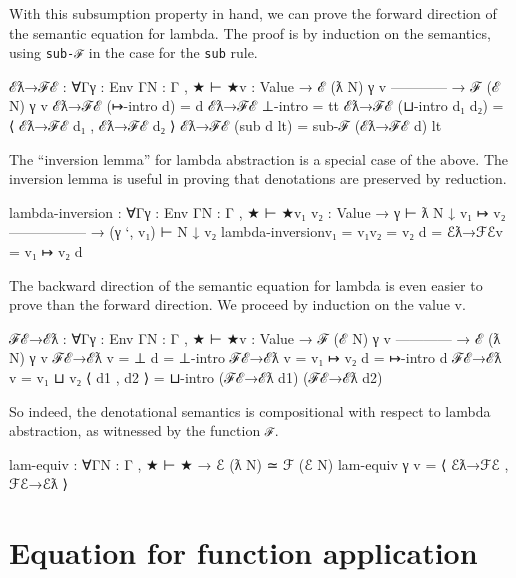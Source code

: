 With this subsumption property in hand, we can prove the forward
direction of the semantic equation for lambda. The proof is by induction
on the semantics, using \texttt{sub-ℱ} in the case for the \texttt{sub}
rule.

\begin{fence}
\begin{code}
ℰƛ→ℱℰ : ∀{Γ}{γ : Env Γ}{N : Γ , ★ ⊢ ★}{v : Value}
  → ℰ (ƛ N) γ v
    ------------
  → ℱ (ℰ N) γ v
ℰƛ→ℱℰ (↦-intro d) = d
ℰƛ→ℱℰ ⊥-intro = tt
ℰƛ→ℱℰ (⊔-intro d₁ d₂) = ⟨ ℰƛ→ℱℰ d₁ , ℰƛ→ℱℰ d₂ ⟩
ℰƛ→ℱℰ (sub d lt) = sub-ℱ (ℰƛ→ℱℰ d) lt
\end{code}
\end{fence}

The ``inversion lemma'' for lambda abstraction is a special case of the
above. The inversion lemma is useful in proving that denotations are
preserved by reduction.

\begin{fence}
\begin{code}
lambda-inversion : ∀{Γ}{γ : Env Γ}{N : Γ , ★ ⊢ ★}{v₁ v₂ : Value}
  → γ ⊢ ƛ N ↓ v₁ ↦ v₂
    -----------------
  → (γ `, v₁) ⊢ N ↓ v₂
lambda-inversion{v₁ = v₁}{v₂ = v₂} d = ℰƛ→ℱℰ{v = v₁ ↦ v₂} d
\end{code}
\end{fence}

The backward direction of the semantic equation for lambda is even
easier to prove than the forward direction. We proceed by induction on
the value v.

\begin{fence}
\begin{code}
ℱℰ→ℰƛ : ∀{Γ}{γ : Env Γ}{N : Γ , ★ ⊢ ★}{v : Value}
  → ℱ (ℰ N) γ v
    ------------
  → ℰ (ƛ N) γ v
ℱℰ→ℰƛ {v = ⊥} d = ⊥-intro
ℱℰ→ℰƛ {v = v₁ ↦ v₂} d = ↦-intro d
ℱℰ→ℰƛ {v = v₁ ⊔ v₂} ⟨ d1 , d2 ⟩ = ⊔-intro (ℱℰ→ℰƛ d1) (ℱℰ→ℰƛ d2)
\end{code}
\end{fence}

So indeed, the denotational semantics is compositional with respect to
lambda abstraction, as witnessed by the function \texttt{ℱ}.

\begin{fence}
\begin{code}
lam-equiv : ∀{Γ}{N : Γ , ★ ⊢ ★}
  → ℰ (ƛ N) ≃ ℱ (ℰ N)
lam-equiv γ v = ⟨ ℰƛ→ℱℰ , ℱℰ→ℰƛ ⟩
\end{code}
\end{fence}

\hypertarget{equation-for-function-application}{%
\section{Equation for function
application}\label{equation-for-function-application}}

